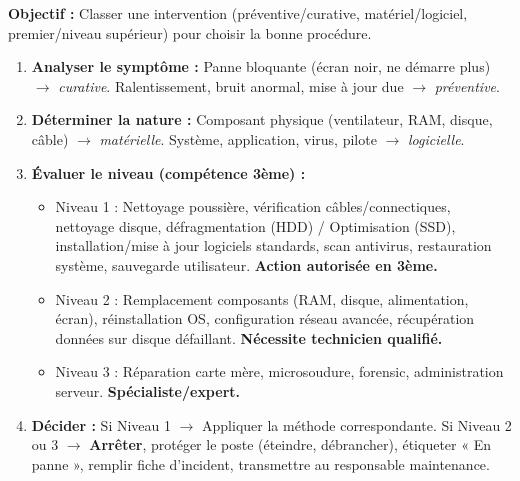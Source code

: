 \documentclass[11pt]{article}
\newcommand{\cle}[1]{{\popxbold\color{popdark}#1}}
\begin{document}
\begin{methode}
    \textbf{Objectif :} Classer une intervention (préventive/curative, matériel/logiciel, premier/niveau supérieur) pour choisir la bonne procédure.
    \begin{enumerate}
        \item \textbf{Analyser le symptôme :} Panne bloquante (écran noir, ne démarre plus) $\rightarrow$ \emph{curative}. Ralentissement, bruit anormal, mise à jour due $\rightarrow$ \emph{préventive}.
        \item \textbf{Déterminer la nature :} Composant physique (ventilateur, RAM, disque, câble) $\rightarrow$ \emph{matérielle}. Système, application, virus, pilote $\rightarrow$ \emph{logicielle}.
        \item \textbf{Évaluer le niveau (compétence 3ème) :}
              \begin{itemize}
                  \item \cle{Niveau 1 :} Nettoyage poussière, vérification câbles/connectiques, nettoyage disque, défragmentation (HDD) / Optimisation (SSD), installation/mise à jour logiciels standards, scan antivirus, restauration système, sauvegarde utilisateur. \textbf{Action autorisée en 3ème.}
                  \item \cle{Niveau 2 :} Remplacement composants (RAM, disque, alimentation, écran), réinstallation OS, configuration réseau avancée, récupération données sur disque défaillant. \textbf{Nécessite technicien qualifié.}
                  \item \cle{Niveau 3 :} Réparation carte mère, microsoudure, forensic, administration serveur. \textbf{Spécialiste/expert.}
              \end{itemize}
        \item \textbf{Décider :} Si Niveau 1 $\rightarrow$ Appliquer la méthode correspondante. Si Niveau 2 ou 3 $\rightarrow$ \textbf{Arrêter}, protéger le poste (éteindre, débrancher), étiqueter « En panne », remplir fiche d'incident, transmettre au responsable maintenance.
    \end{enumerate}
\end{methode}
\end{document}
